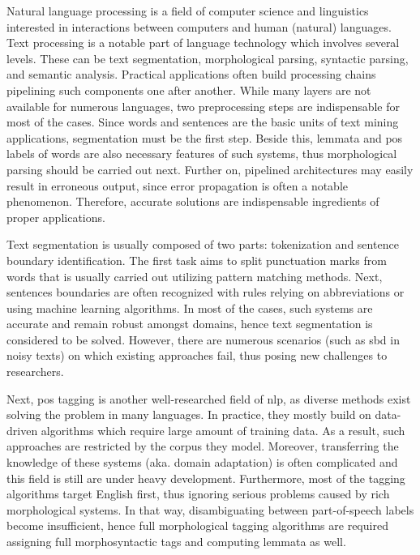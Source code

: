 Natural language processing is a field of computer science and linguistics interested in interactions between computers and human (natural) languages. 
Text processing is a notable part of language technology which involves several levels.
These can be text segmentation, morphological parsing, syntactic parsing, and semantic analysis.
Practical applications often build processing chains pipelining such components one after another. 
While many layers are not available for numerous languages, two preprocessing steps are indispensable for most of the cases.
Since words and sentences are the basic units of text mining applications, segmentation must be the first step.
Beside this, lemmata and \acrshort{pos} labels of words are also necessary features of such systems, thus morphological parsing should be carried out next.
Further on, pipelined architectures may easily result in erroneous output, since error propagation is often a notable phenomenon. 
Therefore, accurate solutions are indispensable ingredients of proper applications. 

Text segmentation is usually composed of two parts: tokenization and sentence boundary identification. 
The first task aims to split punctuation marks from words that is usually carried out utilizing pattern matching methods.
Next, sentences boundaries are often recognized with rules relying on abbreviations or using machine learning algorithms.
In most of the cases, such systems are accurate and remain robust amongst domains, hence text segmentation is considered to be solved.
However, there are numerous scenarios (such as \acrshort{sbd} in noisy texts) on which existing approaches fail, thus posing new challenges to researchers.

Next, \acrshort{pos} tagging is another well-researched field of \acrshort{nlp}, as diverse methods exist solving the problem in many languages. 
In practice, they mostly build on data-driven algorithms which require large amount of training data.
As a result, such approaches are restricted by the corpus they model.
Moreover, transferring the knowledge of these systems (aka. domain adaptation) is often complicated and this field is still are under heavy development.
Furthermore, most of the tagging algorithms target English first, thus ignoring serious problems caused by rich morphological systems.
In that way, disambiguating between part-of-speech labels become insufficient, hence full morphological tagging algorithms are required assigning full morphosyntactic tags and computing lemmata as well.

